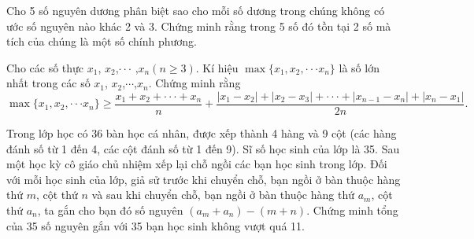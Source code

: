 \begin{ex}%
	Cho 5 số nguyên dương phân biệt sao cho mỗi số dương trong chúng không có ước số nguyên nào khác 2 và 3. Chứng minh rằng trong 5 số đó tồn tại 2 số mà tích của chúng là một số chính phương.
\end{ex}
\begin{ex}%
Cho các số thực $x_1$, $x_2$,$\cdot\cdot\cdot$ ,$x_n (n\ge 3)$. Kí hiệu $\max\{x_1,x_2,\cdot\cdot\cdot x_n\}$ là số lớn nhất trong các số $x_1$, $x_2$,$\cdots$,$x_n$. Chứng minh rằng $$\max\{x_1,x_2,\cdot\cdot\cdot x_n\}\ge \dfrac{x_1+x_2+\cdot\cdot\cdot+x_n}{n}+\dfrac{|x_1-x_2|+|x_2-x_3|+\cdot\cdot\cdot+|x_{n-1}-x_n|+|x_n-x_1|}{2n}.$$
\end{ex}
\begin{ex}%
	Trong lớp học có 36 bàn học cá nhân, được xếp thành 4 hàng và 9 cột (các hàng đánh số từ 1 đến 4, các cột đánh số từ 1 đến 9). Sĩ số học sinh của lớp là 35. Sau một học kỳ cô giáo chủ nhiệm xếp lại chỗ ngồi các bạn học sinh trong lớp. Đối với mỗi học sinh của lớp, giả sử trước khi chuyển chỗ, bạn ngồi ở bàn thuộc hàng thứ $m$, cột thứ $n$ và sau khi chuyển chỗ, bạn ngồi ở bàn thuộc hàng thứ $a_m$, cột thứ $a_n$, ta gắn cho bạn đó số nguyên $(a_m+a_n)-(m+n)$. Chứng minh tổng của 35 số nguyên  gắn với 35 bạn học sinh không vượt quá 11.
\end{ex}
